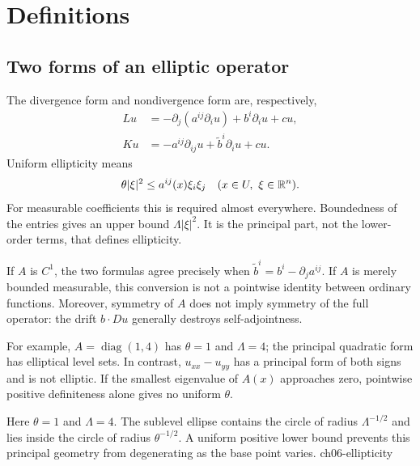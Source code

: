 \section{Definitions}
\label{sec:6-1}
\subsection{Two forms of an elliptic operator}
The divergence form and nondivergence form are, respectively,
\begin{align}
 Lu&=-\partial_j(a^{ij}\partial_i u)+b^i\partial_i u+cu,
       \label{eq:6-div}\\
 Ku&=-a^{ij}\partial_{ij}u+\widetilde b^i\partial_i u+cu.
       \label{eq:6-nondiv}
\end{align}
Uniform ellipticity means
\[
 \theta|\xi|^2\leq a^{ij}(x)\xi_i\xi_j
 \quad(x\in U,\ \xi\in\mathbb{R}^n).
\]
For measurable coefficients this is required almost everywhere.
Boundedness of the entries gives an upper bound $\Lambda|\xi|^2$.
It is the principal part, not the lower-order terms, that defines ellipticity.

\Needspace{45mm}
If $A$ is $C^1$, the two formulas agree precisely when
$\widetilde b^i=b^i-\partial_j a^{ij}$.
If $A$ is merely bounded measurable, this conversion is not a
pointwise identity between ordinary functions.
Moreover, symmetry of $A$ does not imply symmetry of the full operator:
the drift $b\cdot Du$ generally destroys self-adjointness.

For example, $A=\operatorname{diag}(1,4)$ has
$\theta=1$ and $\Lambda=4$; the principal quadratic form has elliptical
level sets. In contrast, $u_{xx}-u_{yy}$ has a principal form of both
signs and is not elliptic. If the smallest eigenvalue of $A(x)$ approaches
zero, pointwise positive definiteness alone gives no uniform $\theta$.

\Needspace{35mm}

{Here $\theta=1$ and $\Lambda=4$. The sublevel ellipse contains the circle of radius $\Lambda^{-1/2}$ and lies inside the circle of radius $\theta^{-1/2}$. A uniform positive lower bound prevents this principal geometry from degenerating as the base point varies.}
{ch06-ellipticity}

